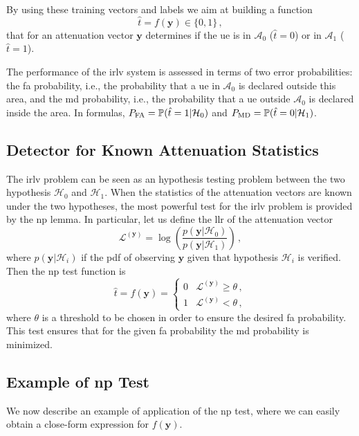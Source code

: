 \documentclass[conference]{IEEEtran}
\begin{document}
By using these training vectors and labels we aim at building a function
\begin{equation}
    \hat{t} = f(\bm{y}) \in \{0,1\}\,,
\end{equation}
that for an attenuation vector $\bm{y}$ determines if the \ac{ue} is in $\mathcal A_0$ ($\hat{t}=0$) or in $\mathcal A_1$ ($\hat{t}=1$).

The performance of the \ac{irlv} system is assessed in terms of two error probabilities: the \ac{fa} probability, i.e., the probability  that a \ac{ue} in $\mathcal A_0$ is declared outside this area, and the \ac{md} probability, i.e., the probability that a \ac{ue} outside $\mathcal A_0$ is declared inside the area. In formulas, $P_{\rm FA} ={\mathbb P}(\hat{t} =1 | \mathcal H_0)$ and  $P_{\rm MD}={\mathbb P}(\hat{t} = 0 | \mathcal H_1)$.

\subsection{Detector for Known Attenuation Statistics}

The \ac{irlv} problem can be seen as an hypothesis testing problem between the two hypothesis $\mathcal H_0$ and $\mathcal H_1$. When the statistics of the attenuation vectors are known under the two hypotheses, the most powerful test for the \ac{irlv} problem is provided by the \ac{np} lemma. In particular, let us  define the \ac{llr} of the attenuation vector
\begin{equation}\label{eq:lr}
    \mathcal{L}^{(\bm{y})}=\log\left(\frac{p(\bm{y}|\mathcal{H}_0)}{p(\bm{y}|\mathcal{H}_1)}\right)\,,
\end{equation}
where $p(\bm{y}|\mathcal{H}_i)$ if the \ac{pdf} of observing $\bm{y}$ given that hypothesis $\mathcal H_i$ is verified. Then the \ac{np} test function is 
\begin{equation}
    \hat{t} = f(\bm{y}) = \begin{cases}
    0 & \mathcal{L}^{(\bm{y})} \geq \theta\,, \\ 
    1 & \mathcal{L}^{(\bm{y})} < \theta\,, 
    \end{cases}
\end{equation}
where $\theta$ is a threshold to be chosen in order to ensure the desired \ac{fa} probability. This test ensures that for the given \ac{fa} probability the \ac{md} probability is minimized. 

\subsection{Example of \ac{np} Test}
\label{sec:los}
We now describe an example of application of the \ac{np} test, where we can easily obtain a close-form expression for $f(\bm{y})$. 
\end{document}
